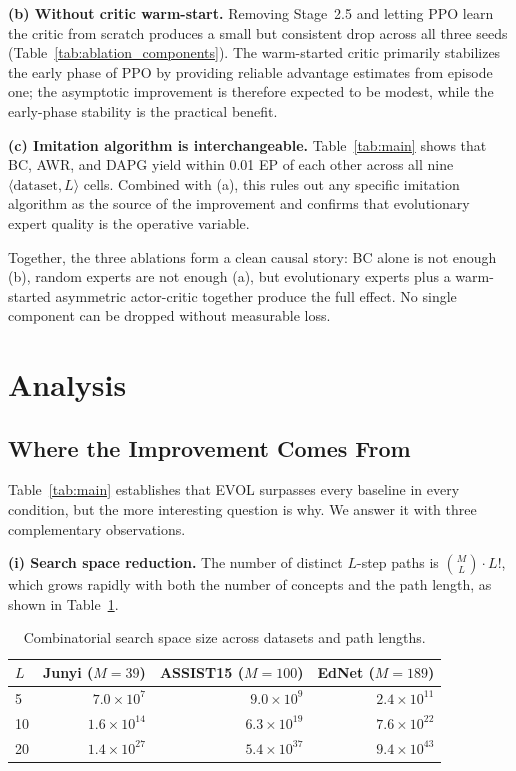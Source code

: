 \documentclass[sigconf,anonymous]{acmart}
\newcommand{\ours}{\textrm{EVOL}}
\begin{document}
\textbf{(b) Without critic warm-start.}
Removing Stage~2.5 and letting PPO learn the critic from scratch produces a small but consistent drop across all three seeds (Table~\ref{tab:ablation_components}). The warm-started critic primarily stabilizes the early phase of PPO by providing reliable advantage estimates from episode one; the asymptotic improvement is therefore expected to be modest, while the early-phase stability is the practical benefit.

\textbf{(c) Imitation algorithm is interchangeable.}
Table~\ref{tab:main} shows that BC, AWR, and DAPG yield within 0.01 EP of each other across all nine $\langle\text{dataset},L\rangle$ cells. Combined with (a), this rules out any specific imitation algorithm as the source of the improvement and confirms that evolutionary expert quality is the operative variable.

Together, the three ablations form a clean causal story: BC alone is not enough (b), random experts are not enough (a), but evolutionary experts plus a warm-started asymmetric actor-critic together produce the full effect. No single component can be dropped without measurable loss.


\section{Analysis}

\subsection{Where the Improvement Comes From}

Table~\ref{tab:main} establishes that \ours{} surpasses every baseline in every condition, but the more interesting question is why. We answer it with three complementary observations.

\textbf{(i) Search space reduction.}
The number of distinct $L$-step paths is $\binom{M}{L}\cdot L!$, which grows rapidly with both the number of concepts and the path length, as shown in Table~\ref{tab:search_space}.

\begin{table}[t]
\centering
\caption{Combinatorial search space size across datasets and path lengths.}
\label{tab:search_space}
\small
\begin{tabular}{@{}lrrr@{}}
\toprule
$L$ & Junyi ($M{=}39$) & ASSIST15 ($M{=}100$) & EdNet ($M{=}189$) \\
\midrule
5  & $7.0\!\times\!10^{7}$  & $9.0\!\times\!10^{9}$  & $2.4\!\times\!10^{11}$ \\
10 & $1.6\!\times\!10^{14}$ & $6.3\!\times\!10^{19}$ & $7.6\!\times\!10^{22}$ \\
20 & $1.4\!\times\!10^{27}$ & $5.4\!\times\!10^{37}$ & $9.4\!\times\!10^{43}$ \\
\bottomrule
\end{tabular}
\end{table}
\end{document}
